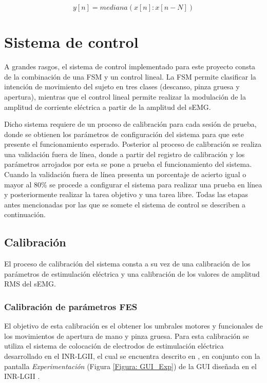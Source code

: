 \begin{equation}
	y[n] = mediana(x[n]:x[n-N])
	\label{Ecu: Mediana}
\end{equation}


\newpage
\section{Sistema de control}
A grandes rasgos, el sistema de control implementado para este proyecto consta de la combinación de una FSM y un control lineal. La FSM permite clasificar la intención de movimiento del sujeto en tres clases (descanso, pinza gruesa y apertura), mientras que el control lineal permite realizar la modulación de la amplitud de corriente eléctrica a partir de la amplitud del sEMG. 

Dicho sistema requiere de un proceso de calibración para cada sesión de prueba, donde se obtienen los parámetros de configuración del sistema para que este presente el funcionamiento esperado. Posterior al proceso de calibración se realiza una validación fuera de línea, donde a partir del registro de calibración y los parámetros arrojados por esta se pone a prueba el funcionamiento del sistema. Cuando la validación fuera de línea presenta un porcentaje de acierto igual o mayor al 80$\%$ se procede a configurar el sistema para realizar una prueba en línea y posteriormente realizar la tarea objetivo y una tarea libre. Todas las etapas antes mencionadas por las que se somete el sistema de control se describen a continuación.

\subsection{Calibración}
El proceso de calibración del sistema consta a su vez de una calibración de los parámetros de estimulación eléctrica y una calibración de los valores de amplitud RMS del sEMG.

\subsubsection{Calibración de parámetros FES}
El objetivo de esta calibración es el obtener los umbrales motores y funcionales de los movimientos de apertura de mano y pinza gruesa. Para esta calibración se utiliza el sistema de colocación de electrodos de estimulación eléctrica desarrollado en el INR-LGII, el cual se encuentra descrito en \cite{AnaMartin2019}, en conjunto con la pantalla \emph{Experimentación} (Figura \ref{Figura: GUI_Exp}) de la GUI diseñada en el INR-LGII \cite{JanethFuentes2018}.

